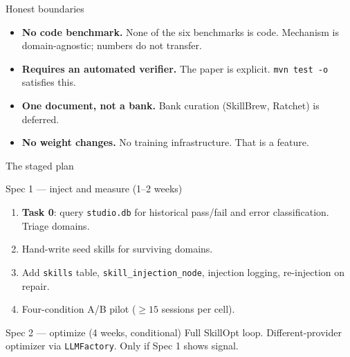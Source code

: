 \documentclass[aspectratio=169,11pt]{beamer}
\begin{document}
\begin{frame}{Honest boundaries}
  \begin{itemize}
    \item \textbf{No code benchmark.} None of the six benchmarks is
    code. Mechanism is domain-agnostic; numbers do not transfer.
    \item \textbf{Requires an automated verifier.} The paper is
    explicit. \texttt{mvn test -o} satisfies this.
    \item \textbf{One document, not a bank.} Bank curation (SkillBrew,
    Ratchet) is deferred.
    \item \textbf{No weight changes.} No training infrastructure. That
    is a feature.
  \end{itemize}
\end{frame}

\begin{frame}{The staged plan}
  \begin{block}{Spec 1 --- inject and measure (1--2 weeks)}
  \small
  \begin{enumerate}
    \item \textbf{Task 0}: query \texttt{studio.db} for historical
    pass/fail and error classification. Triage domains.
    \item Hand-write seed skills for surviving domains.
    \item Add \texttt{skills} table, \texttt{skill\_injection\_node},
    injection logging, re-injection on repair.
    \item Four-condition A/B pilot ($\ge 15$ sessions per cell).
  \end{enumerate}
  \end{block}

  \begin{block}{Spec 2 --- optimize (4 weeks, conditional)}
  \small
  Full SkillOpt loop. Different-provider optimizer via
  \texttt{LLMFactory}. Only if Spec 1 shows signal.
  \end{block}
\end{frame}
\end{document}
